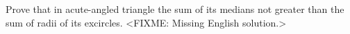 \problem{}
Prove that in acute-angled triangle the sum of its medians not greater than the sum of radii of its excircles.
\solution
<FIXME: Missing English solution.>
\endproblem
